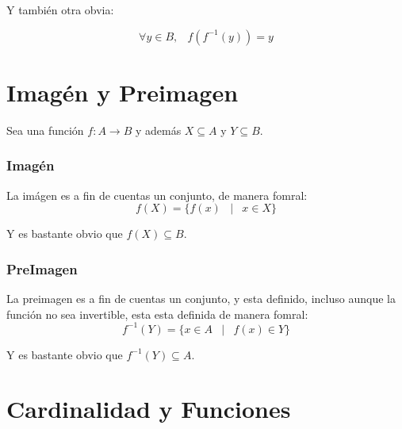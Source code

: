 \documentclass[12pt, fleqn]{report}                             %
\DeclareMathOperator \Space {\quad}                             %
\DeclareMathOperator \MiniSpace {\;}                            %
\newcommand \Such {\MiniSpace|\MiniSpace}                       %
\begin{document}
            Y también otra obvia:

            \begin{equation}
                \forall y \in B, \MiniSpace f(f^{-1}(y)) = y
            \end{equation}




        \clearpage
        \section{Imagén y Preimagen}

            Sea una función $f : A \to B$ y además $X \subseteq A$ y $Y \subseteq B$.  

            \subsubsection{Imagén}
                La imágen es a fin de cuentas un conjunto, de manera fomral:
                \begin{equation} 
                    f(X) = \{ f(x) \Such x \in X \} 
                \end{equation} 

                Y es bastante obvio que $f(X) \subseteq B$.

            \subsubsection{PreImagen}
                La preimagen es a fin de cuentas un conjunto, y esta definido,
                incluso aunque la función no sea invertible, esta esta definida
                de manera fomral:
                \begin{equation} 
                    f^{-1}(Y) = \{ x \in A \Such f(x) \in Y \} 
                \end{equation} 

                Y es bastante obvio que $f^{-1}(Y) \subseteq A$.





        \clearpage
        \section{Cardinalidad y Funciones}
\end{document}
